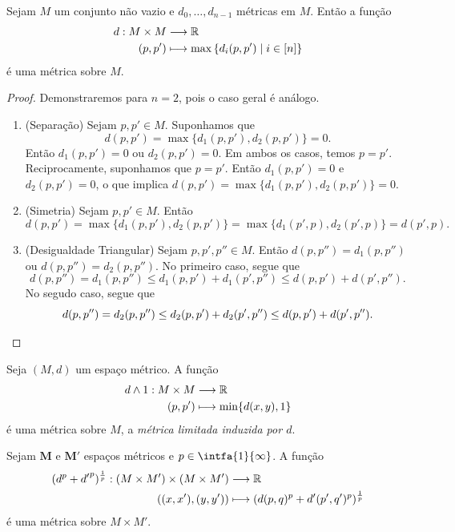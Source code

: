 \begin{prop}
Sejam $M$ um conjunto não vazio e $d_0, \ldots,d_{n-1}$ métricas em $M$. Então a função
	\begin{align*}
	{d}: {M \times M} &\longrightarrow {\mathbb{R}} \\{(p,p')} &\longmapsto {\max\left\{d_i(p,p') \;\middle\vert\; i \in [n] \right\}}
	\end{align*}
é uma métrica sobre $M$.
\end{prop}
\begin{proof}
Demonstraremos para $n=2$, pois o caso geral é análogo.
	\begin{enumerate}
	\item (Separação) Sejam $p,p' \in M$. Suponhamos que
	\begin{equation*}
	d(p,p')=\max\{d_1(p,p'),d_2(p,p')\}=0.
	\end{equation*}
Então $d_1(p,p')=0$ ou $d_2(p,p')=0$. Em ambos os casos, temos $p=p'$. Reciprocamente, suponhamos que $p=p'$. Então $d_1(p,p')=0$ e $d_2(p,p')=0$, o que implica $d(p,p')=\max\{d_1(p,p'),d_2(p,p')\}=0$.
	
	\item (Simetria) Sejam $p,p' \in M$. Então
	\begin{equation*}
	d(p,p') = \max\{d_1(p,p'),d_2(p,p')\} = \max\{d_1(p',p),d_2(p',p)\} = d(p',p).
	\end{equation*}
	
	\item (Desigualdade Triangular) Sejam $p,p',p'' \in M$. Então $d(p,p'')=d_1(p,p'')$ ou $d(p,p'')=d_2(p,p'')$. No primeiro caso, segue que
	\begin{equation*}
	d(p,p'') = d_1(p,p'') \leq d_1(p,p') + d_1(p',p'') \leq d(p,p') + d(p',p'').
	\end{equation*}
	No segudo caso, segue que
	\begin{equation*}
	d(p,p'') = d_2(p,p'') \leq d_2(p,p') + d_2(p',p'') \leq d(p,p') + d(p',p''). \qedhere
	\end{equation*}
	\end{enumerate}
\end{proof}

\begin{exerc}
Seja $(M,d)$ um espaço métrico. A função
	\begin{align*}
	{d \wedge 1}: {M \times M} &\longrightarrow {\mathbb{R}} \\{(p,p')} &\longmapsto {\min \{d(x,y),1\}}
	\end{align*}
é uma métrica sobre $M$, a \emph{métrica limitada induzida por $d$}.
\end{exerc}

\begin{exerc}[Métricas $p$]
Sejam $\bm M$ e $\bm M'$ espaços métricos e $p \in \intfa{1}{\infty}$.
A função
	\begin{align*}
	{(d^p + {d'}^p)^{\frac{1}{p}}}: {(M \times M') \times (M \times M')} &\longrightarrow {\mathbb{R}} \\{((x,x'),(y,y'))} &\longmapsto {(d(p,q)^p + d'(p',q')^p)^{\frac{1}{p}}}
	\end{align*}
é uma métrica sobre $M \times M'$.
\end{exerc}

